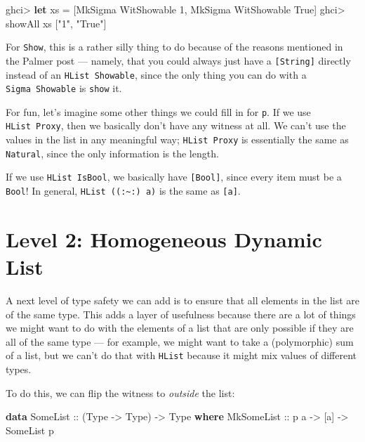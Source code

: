 \documentclass[]{article}
\newenvironment{Shaded}{}{}
\newcommand{\DataTypeTok}[1]{\textcolor[rgb]{0.56,0.13,0.00}{#1}}
\newcommand{\DecValTok}[1]{\textcolor[rgb]{0.25,0.63,0.44}{#1}}
\newcommand{\KeywordTok}[1]{\textcolor[rgb]{0.00,0.44,0.13}{\textbf{#1}}}
\newcommand{\NormalTok}[1]{#1}
\newcommand{\OperatorTok}[1]{\textcolor[rgb]{0.40,0.40,0.40}{#1}}
\newcommand{\OtherTok}[1]{\textcolor[rgb]{0.00,0.44,0.13}{#1}}
\newcommand{\StringTok}[1]{\textcolor[rgb]{0.25,0.44,0.63}{#1}}
\begin{document}
\begin{Shaded}
\begin{Highlighting}[]
\NormalTok{ghci}\OperatorTok{>} \KeywordTok{let}\NormalTok{ xs }\OtherTok{=}\NormalTok{ [}\DataTypeTok{MkSigma} \DataTypeTok{WitShowable} \DecValTok{1}\NormalTok{, }\DataTypeTok{MkSigma} \DataTypeTok{WitShowable} \DataTypeTok{True}\NormalTok{]}
\NormalTok{ghci}\OperatorTok{>}\NormalTok{ showAll xs}
\NormalTok{[}\StringTok{"1"}\NormalTok{, }\StringTok{"True"}\NormalTok{]}
\end{Highlighting}
\end{Shaded}

For \texttt{Show}, this is a rather silly thing to do because of the reasons
mentioned in the Palmer post --- namely, that you could always just have a
\texttt{{[}String{]}} directly instead of an \texttt{HList\ Showable}, since the
only thing you can do with a \texttt{Sigma\ Showable} is \texttt{show} it.

For fun, let's imagine some other things we could fill in for \texttt{p}. If we
use \texttt{HList\ Proxy}, then we basically don't have any witness at all. We
can't use the values in the list in any meaningful way; \texttt{HList\ Proxy} is
essentially the same as \texttt{Natural}, since the only information is the
length.

If we use \texttt{HList\ IsBool}, we basically have \texttt{{[}Bool{]}}, since
every item must be a \texttt{Bool}! In general,
\texttt{HList\ ((:\textasciitilde{}:)\ a)} is the same as \texttt{{[}a{]}}.

\hypertarget{level-2-homogeneous-dynamic-list}{%
\section{Level 2: Homogeneous Dynamic
List}\label{level-2-homogeneous-dynamic-list}}

A next level of type safety we can add is to ensure that all elements in the
list are of the same type. This adds a layer of usefulness because there are a
lot of things we might want to do with the elements of a list that are only
possible if they are all of the same type --- for example, we might want to take
a (polymorphic) sum of a list, but we can't do that with \texttt{HList} because
it might mix values of different types.

To do this, we can flip the witness to \emph{outside} the list:

\begin{Shaded}
\begin{Highlighting}[]
\KeywordTok{data} \DataTypeTok{SomeList}\OtherTok{ ::}\NormalTok{ (}\DataTypeTok{Type} \OtherTok{{-}>} \DataTypeTok{Type}\NormalTok{) }\OtherTok{{-}>} \DataTypeTok{Type} \KeywordTok{where}
    \DataTypeTok{MkSomeList}\OtherTok{ ::}\NormalTok{ p a }\OtherTok{{-}>}\NormalTok{ [a] }\OtherTok{{-}>} \DataTypeTok{SomeList}\NormalTok{ p}
\end{Highlighting}
\end{Shaded}
\end{document}

